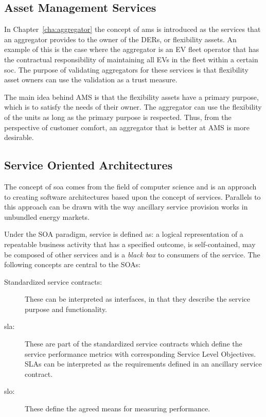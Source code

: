 \subsection{Asset Management Services} %
\label{sub:assetmanagementservices}
In Chapter~\ref{cha:aggregator} the concept of \gls{ams} is introduced as the services that an aggregator provides to the owner of the DERs, or flexibility assets. An example of this is the case where the aggregator is an EV fleet operator that has the contractual responsibility of maintaining all EVs in the fleet within a certain \gls{soc}. The purpose of validating aggregators for these services is that flexibility asset owners can use the validation as a trust measure.

The main idea behind AMS is that the flexibility assets have a primary purpose, which is to satisfy the needs of their owner. The aggregator can use the flexibility of the units as long as the primary purpose is respected. Thus, from the perspective of customer comfort, an aggregator that is better at AMS is more desirable. 

\subsection{Service Oriented Architectures} %
\label{sub:ServiceOrientedArchitectures}
The concept of \gls{soa} comes from the field of computer science and is an approach to creating software architectures based upon the concept of services. Parallels to this approach can be drawn with the way ancillary service provision works in unbundled energy markets. 

Under the SOA paradigm, service is defined as: a logical representation of a repeatable business activity that has a specified outcome, is self-contained, may be composed of other services and is a \emph{black box} to consumers of the service. The following concepts are central to the SOAs:
\begin{description}
	\item[Standardized service contracts:] These can be interpreted as interfaces, in that they describe the service purpose and functionality.
	\item[\gls{sla}:] These are part of the standardized service contracts which define the service performance metrics with corresponding Service Level Objectives. SLAs can be interpreted as the requirements defined in an ancillary service contract.
	\item[\gls{slo}:] These define the agreed means for measuring performance.
\end{description}
